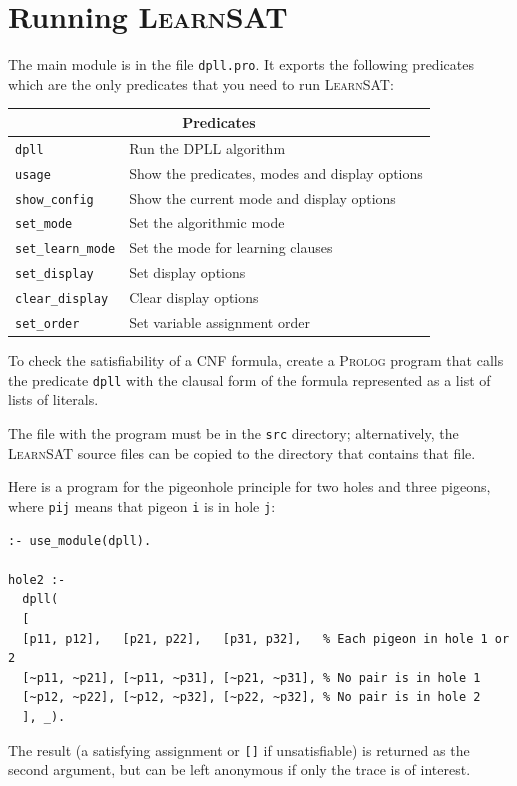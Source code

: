\documentclass[11pt]{article}
\newcommand*{\p}[1]{\textup{\texttt{#1}}}
\newcommand*{\ls}{\textsc{LearnSAT}}
\newcommand*{\pl}{\textsc{Prolog}}
\begin{document}
\newpage

\section{Running \ls}

The main module is in the file \p{dpll.pro}. It exports the following
predicates which are the only predicates that you need to run \ls{}:

\begin{center}
\begin{tabular}{|l|l|}
\hline
\multicolumn{2}{|c|}{\textbf{\large Predicates}}\\
\hline
\p{dpll}&Run the DPLL algorithm\\
\p{usage}&Show the predicates, modes and display options \\
\p{show\_config}&Show the current mode and display options\\
\p{set\_mode}&Set the algorithmic mode\\
\p{set\_learn\_mode}&Set the mode for learning clauses\\
\p{set\_display}&Set display options\\
\p{clear\_display}&Clear display options\\
\p{set\_order}&Set variable assignment order\\
\hline
\end{tabular}
\end{center}

To check the satisfiability of a CNF formula, create a \pl{} program
that calls the predicate \p{dpll} with the clausal form of the formula
represented as a list of lists of literals.

The file with the program must be in the \p{src} directory;
alternatively, the \ls{} source files can be copied to the directory
that contains that file.

Here is a program for the pigeonhole principle for two holes and three
pigeons, where \p{pij} means that pigeon \p{i} is in hole \p{j}:

\begin{verbatim}
:- use_module(dpll).

hole2 :-
  dpll(
  [
  [p11, p12],   [p21, p22],   [p31, p32],   % Each pigeon in hole 1 or 2 
  [~p11, ~p21], [~p11, ~p31], [~p21, ~p31], % No pair is in hole 1
  [~p12, ~p22], [~p12, ~p32], [~p22, ~p32], % No pair is in hole 2
  ], _).
\end{verbatim}

The result (a satisfying assignment or \p{[]} if unsatisfiable) is
returned as the second argument, but can be left anonymous if only
the trace is of interest.
\end{document}
